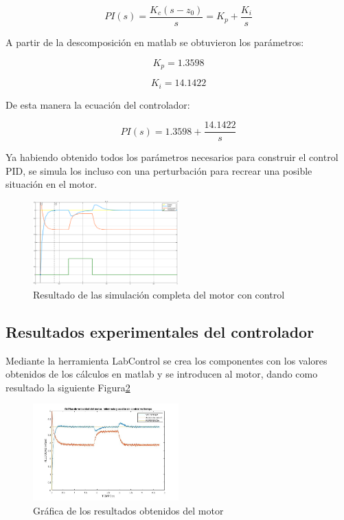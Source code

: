 \documentclass[conference]{IEEEtran}
\begin{document}
\begin{equation}
    PI(s)= \dfrac{K_c(s-z_0)}{s}= K_p + \dfrac{K_i}{s}
    \label{EQ_2}
\end{equation}

A partir de la descomposición en matlab se obtuvieron los parámetros:

\begin{equation}
    K_p=1.3598
    \label{EQ_4}
\end{equation}

\begin{equation}
    K_i=14.1422
    \label{EQ_5}
\end{equation}

De esta manera la ecuación del controlador:

\begin{equation}
    PI(s)= 1.3598 + \dfrac{14.1422}{s}
    \label{EQ_6}
\end{equation}

Ya habiendo obtenido todos los parámetros necesarios para construir el control PID, se simula los incluso con una perturbación para recrear una posible situación en el motor.

\begin{figure}[h]
\centering
\includegraphics[width=0.5\textwidth]{images/Sumalcioncompleta.png}
\caption{Resultado de las simulación completa del motor con control}
\label{fig:RSF}
\end{figure}

\subsection{Resultados experimentales del controlador}

Mediante la herramienta LabControl se crea los componentes con los valores obtenidos de los cálculos en matlab y se introducen al motor, dando como resultado la siguiente Figura\ref{fig:R_5}
 
\begin{figure}[h]
\centering
\includegraphics[width=0.5\textwidth]{images/RESULTADOS_MOTOR_CD.jpg}
\caption{Gráfica de los resultados obtenidos del motor}
\label{fig:R_5}
\end{figure}
\end{document}
